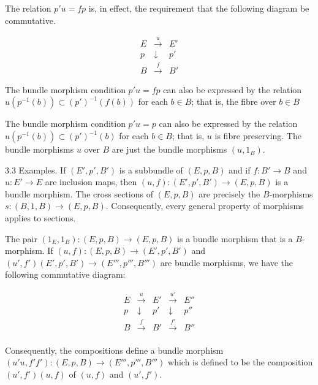 The relation $p'u = fp$ is, in effect, the requirement that the following diagram be commutative.

$$\begin{array}{ccc}
E & \xrightarrow{u} & E' \\
p & \downarrow & p' \\
B & \xrightarrow{f} & B'
\end{array}$$

The bundle morphism condition $p'u = fp$ can also be expressed by the relation $u(p^{-1}(b)) \subset (p')^{-1}(f(b))$ for each $b \in B$; that is, the fibre over $b \in B$

The bundle morphism condition $p'u = p$ can also be expressed by the relation $u(p^{-1}(b)) \subset (p')^{-1}(b)$ for each $b \in B$; that is, $u$ is fibre preserving. The bundle morphisms $u$ over $B$ are just the bundle morphisms $(u, 1_B)$.

3.3 Examples. If $(E', p', B')$ is a subbundle of $(E, p, B)$ and if $f: B' \rightarrow B$ and $u: E' \rightarrow E$ are inclusion maps, then $(u, f): (E', p', B') \rightarrow (E, p, B)$ is a bundle morphism. The cross sections of $(E, p, B)$ are precisely the $B$-morphisms $s: (B, 1, B) \rightarrow (E, p, B)$. Consequently, every general property of morphisms applies to sections.

The pair $(1_E, 1_B): (E, p, B) \rightarrow (E, p, B)$ is a bundle morphism that is a $B$-morphism. If $(u, f): (E, p, B) \rightarrow (E', p', B')$ and $(u', f')(E', p', B') \rightarrow (E''', p''', B''')$ are bundle morphisms, we have the following commutative diagram:

$$\begin{array}{cccc}
E & \xrightarrow{u} & E' & \xrightarrow{u'} & E'' \\
p & \downarrow & p' & \downarrow & p'' \\
B & \xrightarrow{f} & B' & \xrightarrow{f'} & B'' \\
\end{array}$$

Consequently, the compositions define a bundle morphism $(u'u, f'f'): (E, p, B) \rightarrow (E''', p''', B''')$ which is defined to be the composition $(u', f')(u, f)$ of $(u, f)$ and $(u', f')$.
